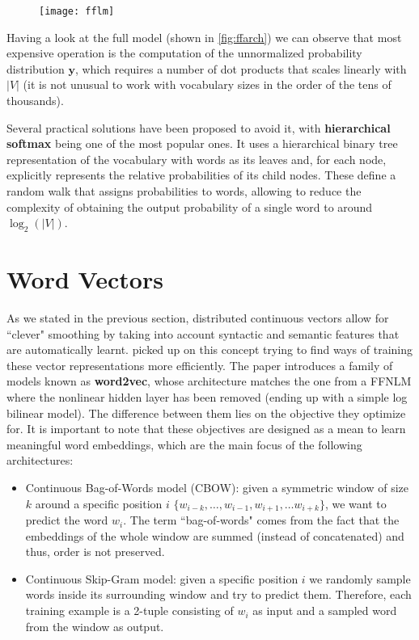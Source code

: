 \begin{figure}[H]
	\centering
	\texttt{[image: fflm]}
	\label{fig:ffarch}
\end{figure}

Having a look at the full model (shown in \autoref{fig:ffarch}) we can observe that most expensive operation is the computation of the unnormalized probability distribution $\mathbf{y}$, which requires a number of dot products that scales linearly with $|V|$ (it is not unusual to work with vocabulary sizes in the order of the tens of thousands). 

Several practical solutions have been proposed to avoid it, with \textbf{hierarchical softmax} \cite{morin2005hierarchical} being one of the most popular ones. It uses a hierarchical binary tree representation of the vocabulary with words as its leaves and, for each node, explicitly represents the relative probabilities of its child nodes. These define a random walk that assigns probabilities to words, allowing to reduce the complexity of obtaining the output probability of a single word to around $\log_2(|V|)$.

\section{Word Vectors}
\label{sec:wv}

As we stated in the previous section, distributed continuous vectors allow for ``clever" smoothing by taking into account syntactic and semantic features that are automatically learnt. \cite{mikolov2013efficient} picked up on this concept trying to find ways of training these vector representations more efficiently. The paper introduces a family of models known as \textbf{word2vec}, whose architecture matches the one from a FFNLM where the nonlinear hidden layer has been removed (ending up with a simple log bilinear model). The difference between them lies on the objective they optimize for. It is important to note that these objectives are designed as a mean to learn meaningful word embeddings, which are the main focus of the following architectures:

\begin{itemize}
	\item Continuous Bag-of-Words model (CBOW): given a symmetric window of size $k$ around a specific position $i$ $\{w_{i-k}, \ldots , w_{i-1}, w_{i+1}, \ldots w_{i+k}\}$, we want to predict the word $w_i$. The term ``bag-of-words" comes from the fact that the embeddings of the whole window are summed (instead of concatenated) and thus, order is not preserved.
	
	\item Continuous Skip-Gram model: given a specific position $i$ we randomly sample words inside its surrounding window and try to predict them. Therefore, each training example is a 2-tuple consisting of $w_i$ as input and a sampled word from the window as output.
\end{itemize}

